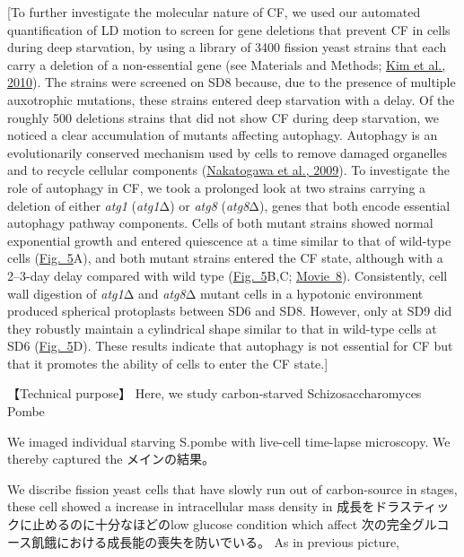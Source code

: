 [To further investigate the molecular nature of CF, we used our automated quantification of LD motion to screen for gene deletions that prevent CF in cells during deep starvation, by using a library of 3400 fission yeast strains that each carry a deletion of a non-essential gene (see Materials and Methods; \href{https://pmc.ncbi.nlm.nih.gov/articles/PMC6857596/\#JCS231688C32}{Kim et al., 2010}). The strains were screened on SD8 because, due to the presence of multiple auxotrophic mutations, these strains entered deep starvation with a delay. Of the roughly 500 deletions strains that did not show CF during deep starvation, we noticed a clear accumulation of mutants affecting autophagy. Autophagy is an evolutionarily conserved mechanism used by cells to remove damaged organelles and to recycle cellular components (\href{https://pmc.ncbi.nlm.nih.gov/articles/PMC6857596/\#JCS231688C52}{Nakatogawa et al., 2009}). To investigate the role of autophagy in CF, we took a prolonged look at two strains carrying a deletion of either \textit{atg1} (\textit{atg1}Δ) or \textit{atg8} (\textit{atg8}Δ), genes that both encode essential autophagy pathway components. Cells of both mutant strains showed normal exponential growth and entered quiescence at a time similar to that of wild-type cells (\href{https://pmc.ncbi.nlm.nih.gov/articles/PMC6857596/\#JCS231688F5}{Fig. 5}A), and both mutant strains entered the CF state, although with a 2–3-day delay compared with wild type (\href{https://pmc.ncbi.nlm.nih.gov/articles/PMC6857596/\#JCS231688F5}{Fig. 5}B,C; \href{http://movie.biologists.com/video/10.1242/jcs.231688/video-8}{Movie 8}). Consistently, cell wall digestion of \textit{atg1}Δ and \textit{atg8}Δ mutant cells in a hypotonic environment produced spherical protoplasts between SD6 and SD8. However, only at SD9 did they robustly maintain a cylindrical shape similar to that in wild-type cells at SD6 (\href{https://pmc.ncbi.nlm.nih.gov/articles/PMC6857596/\#JCS231688F5}{Fig. 5}D). These results indicate that autophagy is not essential for CF but that it promotes the ability of cells to enter the CF state.]

【Technical purpose】
Here, we study carbon-starved {Schizosaccharomyces Pombe}

We imaged individual starving {S.pombe} with live-cell time-lapse microscopy.
We thereby captured the メインの結果。

We discribe fission yeast cells that have slowly run out of carbon-source in stages, these cell showed a increase in intracellular mass density in  成長をドラスティックに止めるのに十分なほどのlow glucose condition  which affect 次の完全グルコース飢餓における成長能の喪失を防いでいる。
As in previous picture, 























